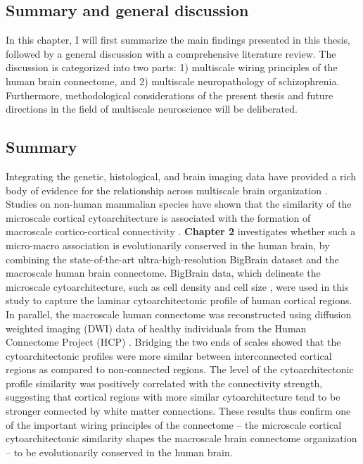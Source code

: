 \pagestyle{MyStyle}

\begin{refsection}

\chapter{Summary and general discussion}
\label{ch:summary}

\newpage

\noindent
In this chapter, I will first summarize the main findings presented in this thesis, followed by a general discussion with a comprehensive literature review. The discussion is categorized into two parts: 1) multiscale wiring principles of the human brain connectome, and 2) multiscale neuropathology of schizophrenia. Furthermore, methodological considerations of the present thesis and future directions in the field of multiscale neuroscience will be deliberated. 

\section*{Summary}
Integrating the genetic, histological, and brain imaging data have provided a rich body of evidence for the relationship across multiscale brain organization \citep{Heuvel2019MultiscaleNO,Scholtens2018MultimodalCI}. Studies on non-human mammalian species have shown that the similarity of the microscale cortical cytoarchitecture is associated with the formation of macroscale cortico-cortical connectivity \citep{barbas2015general,beul2015predictive,beul2017predictive}. \textbf{Chapter 2} investigates whether such a micro-macro association is evolutionarily conserved in the human brain, by combining the state-of-the-art ultra-high-resolution BigBrain dataset and the macroscale human brain connectome. BigBrain data, which delineate the microscale cytoarchitecture, such as cell density and cell size \citep{amunts2013bigbrain}, were used in this study to capture the laminar cytoarchitectonic profile of human cortical regions. In parallel, the macroscale human connectome was reconstructed using diffusion weighted imaging (DWI) data of healthy individuals from the Human Connectome Project (HCP) \citep{VANESSEN201362}. Bridging the two ends of scales showed that the cytoarchitectonic profiles were more similar between interconnected cortical regions as compared to non-connected regions. The level of the cytoarchitectonic profile similarity was positively correlated with the connectivity strength, suggesting that cortical regions with more similar cytoarchitecture tend to be stronger connected by white matter connections. These results thus confirm one of the important wiring principles of the connectome – the microscale cortical cytoarchitectonic similarity shapes the macroscale brain connectome organization – to be evolutionarily conserved in the human brain. 



\end{refsection}
